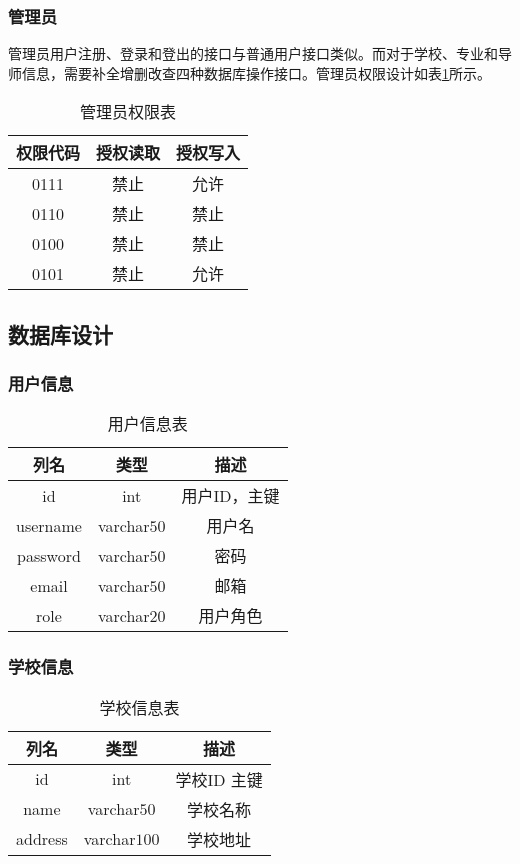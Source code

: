 \documentclass[UTF8]{ctexart}
\begin{document}
    \subsubsection{管理员}
    管理员用户注册、登录和登出的接口与普通用户接口类似。而对于学校、专业和导师信息，需要补全增删改查四种数据库操作接口。管理员权限设计如表\ref{tab:admin}所示。
    \begin{table}
        \caption{管理员权限表}
        \label{tab:admin}
    \begin{center}
    \begin{tabular}{ccc}
        \hline
        权限代码& 授权读取& 授权写入\\
        \hline
        0111& 禁止& 允许\\
        0110& 禁止& 禁止\\
        0100& 禁止& 禁止\\
        0101& 禁止& 允许\\
        \hline
    \end{tabular}
    \end{center}
    \end{table}
    
    \subsection{数据库设计}
    \subsubsection{用户信息}
    \begin{table}[h!]
        \centering
        \caption{用户信息表}
        \begin{tabular}{ccc}
        \hline
        列名 & 类型 & 描述 \\
        \hline
        id & int & 用户ID，主键 \\
        username & varchar\(50\) & 用户名 \\
        password & varchar\(50\) & 密码 \\
        email & varchar\(50\) & 邮箱 \\
        role & varchar\(20\) & 用户角色 \\
        \hline
        \end{tabular}
        \label{tab:user_info}
    \end{table}
    \subsubsection{学校信息}
    \begin{table}[h!]
        \centering
        \caption{学校信息表}
        \begin{tabular}{ccc}
        \hline
        列名 & 类型 & 描述 \\
        \midrule
        id & int & 学校ID 主键 \\
        name & varchar\(50\) & 学校名称 \\
        address & varchar\(100\) & 学校地址 \\
        \hline
        \end{tabular}
        \label{tab:school_info}
    \end{table}
\end{document}
